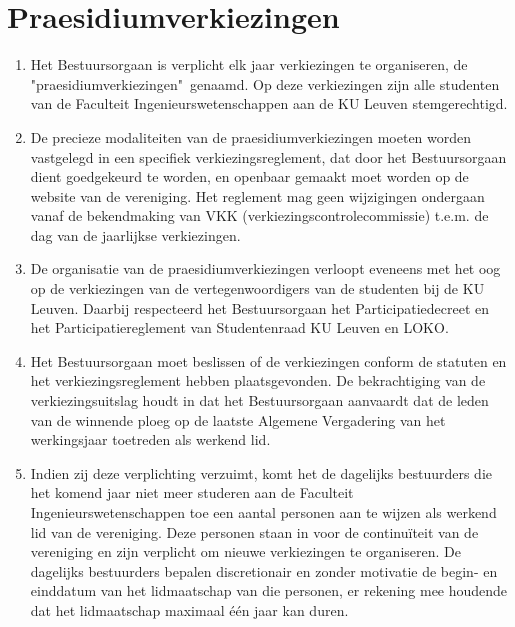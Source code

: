     \section{Praesidiumverkiezingen}
    \begin{enumerate}
        \item Het Bestuursorgaan is verplicht elk jaar verkiezingen te organiseren, de "praesidiumverkiezingen"\ genaamd. Op deze verkiezingen zijn alle studenten van de Faculteit Ingenieurswetenschappen aan de KU Leuven stemgerechtigd.
        \item De precieze modaliteiten van de praesidiumverkiezingen moeten worden vastgelegd in een specifiek verkiezingsreglement, dat door het Bestuursorgaan dient goedgekeurd te worden, en openbaar gemaakt moet worden op de website van de vereniging. Het reglement mag geen wijzigingen ondergaan vanaf de bekendmaking van VKK (verkiezingscontrolecommissie) t.e.m. de dag van de jaarlijkse verkiezingen. 
        \item De organisatie van de praesidiumverkiezingen verloopt eveneens met het oog op de verkiezingen van de vertegenwoordigers van de studenten bij de KU Leuven. Daarbij respecteerd het Bestuursorgaan het Participatiedecreet en het Participatiereglement van Studentenraad KU Leuven en LOKO.
        \item Het Bestuursorgaan moet beslissen of de verkiezingen conform de statuten en het verkiezingsreglement hebben plaatsgevonden. De bekrachtiging van de verkiezingsuitslag houdt in dat het Bestuursorgaan aanvaardt dat de leden van de winnende ploeg op de laatste Algemene Vergadering van het werkingsjaar toetreden als werkend lid. 
        \item Indien zij deze verplichting verzuimt, komt het de dagelijks bestuurders die het komend jaar niet meer studeren aan de Faculteit Ingenieurswetenschappen toe een aantal personen aan te wijzen als werkend lid van de vereniging. Deze personen staan in voor de continu\"iteit van de vereniging en zijn verplicht om nieuwe verkiezingen te organiseren. De dagelijks bestuurders bepalen discretionair en zonder motivatie de begin- en einddatum van het lidmaatschap van die personen, er rekening mee houdende dat het lidmaatschap maximaal \'e\'en jaar kan duren. 
    \end{enumerate}
    
